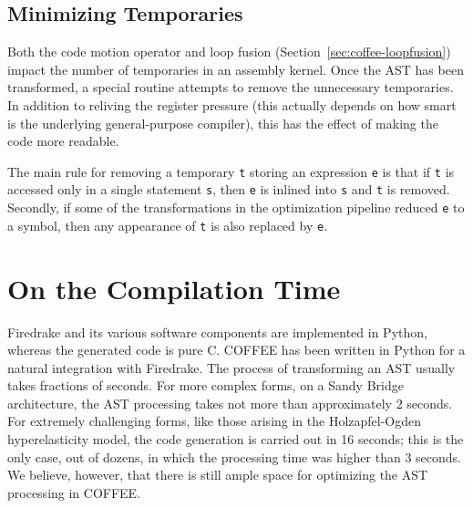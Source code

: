 \subsection{Minimizing Temporaries}
Both the code motion operator and loop fusion (Section~\ref{sec:coffee-loopfusion}) impact the number of temporaries in an assembly kernel. Once the AST has been transformed, a special routine attempts to remove the unnecessary temporaries. In addition to reliving the register pressure (this actually depends on how smart is the underlying general-purpose compiler), this has the effect of making the code more readable.

The main rule for removing a temporary \texttt{t} storing an expression \texttt{e} is that if \texttt{t} is accessed only in a single statement \texttt{s}, then \texttt{e} is inlined into \texttt{s} and \texttt{t} is removed. Secondly, if some of the transformations in the optimization pipeline reduced \texttt{e} to a symbol, then any appearance of \texttt{t} is also replaced by \texttt{e}.

\section{On the Compilation Time}
Firedrake and its various software components are implemented in Python, whereas the generated code is pure C. COFFEE has been written in Python for a natural integration with Firedrake. The process of transforming an AST usually takes fractions of seconds. For more complex forms, on a Sandy Bridge architecture, the AST processing takes not more than approximately 2 seconds. For extremely challenging forms, like those arising in the Holzapfel-Ogden hyperelasticity model, the code generation is carried out in 16 seconds; this is the only case, out of dozens, in which the processing time was higher than 3 seconds. We believe, however, that there is still ample space for optimizing the AST processing in COFFEE.
